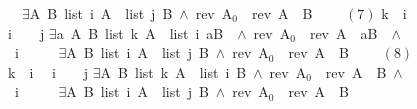 \documentclass[twoside,runningheads,envcountsame,envcountsect,oribibl,orivec]{llncs}
\begin{document}
\begin{figure}
\begin{isabellebody}
\ \ $\exists$A\ B{\isachardot}\ {\isacharparenleft}list\ {\isacharbackquote}i\ A\ {\isacharasterisk}\ list\ {\isacharbackquote}j\ B{\isacharparenright}\ $\wedge$\ {\isacharparenleft}rev\ A$_0${\isacharparenright}\ {\isacharequal}\ {\isacharparenleft}rev\ A{\isacharparenright}\ {\isacharat}\ B\ {\isasymrbrakk}
\isanewline\ \ \ {\isasymsqsubseteq}\hfill $(7)$\isanewline
{\isacharbackquote}k\ {\isacharcolon}{\isacharequal}\ {\isacharat}{\isacharparenleft}{\isacharbackquote}i\ {\isacharplus}\ {}{\isacharparenright}{\isacharsemicolon}\isanewline
{\isacharat}{\isacharparenleft}{\isacharbackquote}i\ {\isacharplus}\ {}{\isacharparenright}\ {\isacharcolon}{\isacharequal}\ {\isacharbackquote}j{\isacharsemicolon}\isanewline
{\isasymlbrakk}{\isacharparenleft}$\exists$a\ A\ B{\isachardot}\ {\isacharparenleft}list\ {\isacharbackquote}k\ A\ {\isacharasterisk}\ list\ {\isacharbackquote}i\ {\isacharparenleft}a{\isacharhash}B{\isacharparenright}\ {\isacharparenright}\ $\wedge$\ {\isacharparenleft}rev\ A$_0${\isacharparenright}\ {\isacharequal}\ {\isacharparenleft}rev\ A{\isacharparenright}\ {\isacharat}\ {\isacharparenleft}a{\isacharhash}B{\isacharparenright}\ {\isacharparenright}\ $\wedge$\ {\isacharbackquote}i\ {\isasymnoteq}\ {}{\isacharcomma}\ \isanewline
\ \ $\exists$A\ B{\isachardot}\ {\isacharparenleft}list\ {\isacharbackquote}i\ A\ {\isacharasterisk}\ list\ {\isacharbackquote}j\ B{\isacharparenright}\ $\wedge$\ {\isacharparenleft}rev\ A$_0${\isacharparenright}\ {\isacharequal}\ {\isacharparenleft}rev\ A{\isacharparenright}\ {\isacharat}\ B\ {\isasymrbrakk}
\isanewline\ \ \ {\isasymsqsubseteq}\hfill $(8)$\isanewline
{\isacharbackquote}k\ {\isacharcolon}{\isacharequal}\ {\isacharat}{\isacharparenleft}{\isacharbackquote}i\ {\isacharplus}\ {}{\isacharparenright}{\isacharsemicolon}\isanewline
{\isacharat}{\isacharparenleft}{\isacharbackquote}i\ {\isacharplus}\ {}{\isacharparenright}\ {\isacharcolon}{\isacharequal}\ {\isacharbackquote}j{\isacharsemicolon}\isanewline
{\isasymlbrakk}{\isacharparenleft}$\exists$A\ B{\isachardot}\ {\isacharparenleft}list\ {\isacharbackquote}k\ A\ {\isacharasterisk}\ list\ {\isacharbackquote}i\ B{\isacharparenright}\ $\wedge$\ {\isacharparenleft}rev\ A$_0${\isacharparenright}\ {\isacharequal}\ {\isacharparenleft}rev\ A{\isacharparenright}\ {\isacharat}\ B{\isacharparenright}\ $\wedge$\ {\isacharbackquote}i\ {\isasymnoteq}\ {}{\isacharcomma}\ \isanewline
\ \ $\exists$A\ B{\isachardot}\ {\isacharparenleft}list\ {\isacharbackquote}i\ A\ {\isacharasterisk}\ list\ {\isacharbackquote}j\ B{\isacharparenright}\ $\wedge$\ {\isacharparenleft}rev\ A$_0${\isacharparenright}\ {\isacharequal}\ {\isacharparenleft}rev\ A{\isacharparenright}\ {\isacharat}\ B\ {\isasymrbrakk}

\end{isabellebody}
\end{figure}
\end{document}
